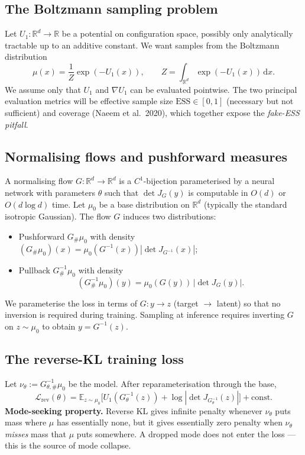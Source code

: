 \documentclass[11pt,letterpaper]{article}
\newcommand{\E}{\mathbb{E}}
\newcommand{\Real}{\mathbb{R}}
\newcommand{\ESS}{\mathrm{ESS}}
\newcommand{\dd}{\mathrm{d}}
\theoremstyle{plain}
\begin{document}
\subsection{The Boltzmann sampling problem}

Let $U_1:\Real^d\to\Real$ be a potential on configuration space, possibly only
analytically tractable up to an additive constant. We want samples from the
Boltzmann distribution
\[
  \mu(x) = \frac{1}{Z}\exp(-U_1(x)), \qquad Z = \int_{\Real^d} \exp(-U_1(x))\,\dd x.
\]
We assume only that $U_1$ and $\nabla U_1$ can be evaluated pointwise. The two
principal evaluation metrics will be effective sample size $\ESS\in[0,1]$
(necessary but not sufficient) and coverage (Naeem et al.\ 2020), which together
expose the \emph{fake-ESS pitfall}.

\subsection{Normalising flows and pushforward measures}

A normalising flow $G:\Real^d\to\Real^d$ is a $C^1$-bijection parameterised by a
neural network with parameters $\theta$ such that $\det J_G(y)$ is computable in
$O(d)$ or $O(d\log d)$ time. Let $\mu_0$ be a base distribution on $\Real^d$
(typically the standard isotropic Gaussian). The flow $G$ induces two distributions:

\begin{itemize}\setlength{\itemsep}{2pt}
  \item Pushforward $G_\#\mu_0$ with density $(G_\#\mu_0)(x)=\mu_0(G^{-1}(x))|\det J_{G^{-1}}(x)|$;
  \item Pullback $G^{-1}_\#\mu_0$ with density
  \[
    (G^{-1}_\#\mu_0)(y) = \mu_0(G(y))\,|\det J_G(y)|.
  \]
\end{itemize}

We parameterise the loss in terms of $G:y\to z$ (target $\to$ latent) so that no
inversion is required during training. Sampling at inference requires inverting
$G$ on $z\sim\mu_0$ to obtain $y=G^{-1}(z)$.

\subsection{The reverse-KL training loss}

Let $\nu_\theta:=G^{-1}_{\theta,\#}\mu_0$ be the model. After reparameterisation
through the base,
\[
  \mathcal L_{\mathrm{rev}}(\theta)
  = \E_{z\sim\mu_0}\!\big[U_1(G^{-1}_\theta(z)) + \log|\det J_{G^{-1}_\theta}(z)|\big] + \mathrm{const}.
\]
\textbf{Mode-seeking property.} Reverse KL gives infinite penalty whenever
$\nu_\theta$ puts mass where $\mu$ has essentially none, but it gives essentially
zero penalty when $\nu_\theta$ \emph{misses} mass that $\mu$ puts somewhere. A
dropped mode does not enter the loss --- this is the source of mode collapse.
\end{document}
